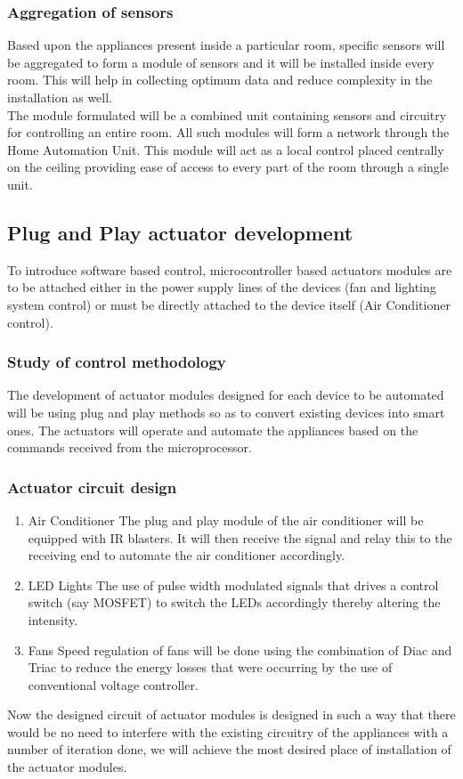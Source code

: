 \documentclass[12pt,a4paper,titlepage,twoside]{article}
\begin{document}
        \subsubsection{Aggregation of sensors}
        Based upon the appliances present inside a particular room, specific sensors will be aggregated to form a module of sensors and it will be installed inside every room. This will help in collecting optimum data and reduce complexity in the installation as well.\\
        
        The module formulated will be a combined unit containing sensors and circuitry for controlling an entire room. All such modules will form a network through the Home Automation Unit. This module will act as a local control placed centrally on the ceiling providing ease of access to every part of the room through a single unit.
        
        \subsection{Plug and Play actuator development}
        To introduce software based control, microcontroller based actuators modules are to be attached either in the power supply lines of the devices (fan and lighting system control) or must be directly attached to the device itself (Air Conditioner control).
        
        \subsubsection{Study of control methodology}
        The development of actuator modules designed for each device to be automated will be using plug and play methods so as to convert existing devices into smart ones. The actuators will operate and automate the appliances based on the commands received from the microprocessor.
        \subsubsection{Actuator circuit design}
        \begin{enumerate}
            \item Air Conditioner
            The plug and play module of the air conditioner will be equipped with IR blasters. It will then receive the signal and relay this to the receiving end to automate the air conditioner accordingly.
            \item LED Lights
            The use of pulse width modulated signals that drives a control switch (say MOSFET) to switch the LEDs accordingly thereby altering the intensity.
            \item Fans
            Speed regulation of fans will be done using the combination of  Diac and Triac to reduce the energy losses that were occurring by the use of conventional voltage controller.
        \end{enumerate}
        Now the designed circuit of actuator modules is designed in such a way that there would be no need to interfere with the existing circuitry of the appliances with a number of iteration done, we will achieve the most desired place of installation of the actuator modules.
\end{document}
